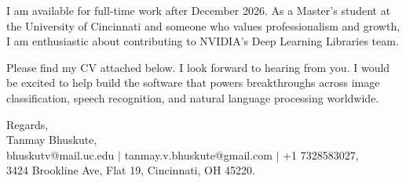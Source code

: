 \documentclass[11pt]{letter}
\begin{document}
\begin{letter}{}
I am available for full-time work after December 2026. As a Master's student at the University of Cincinnati and someone who values professionalism and growth, I am enthusiastic about contributing to NVIDIA's Deep Learning Libraries team.

Please find my CV attached below. I look forward to hearing from you. I would be excited to help build the software that powers breakthroughs across image classification, speech recognition, and natural language processing worldwide.

{\setlength{\parskip}{0pt}
Regards,\\
Tanmay Bhuskute,\\
bhuskutv@mail.uc.edu $\mid$ tanmay.v.bhuskute@gmail.com $\mid$ +1 7328583027,\\
3424 Brookline Ave, Flat 19, Cincinnati, OH 45220.
}

\end{letter}
\end{document}
